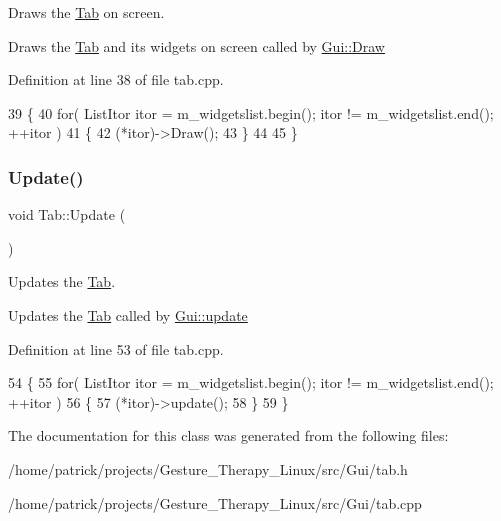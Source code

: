 Draws the \hyperlink{class_tab}{Tab} on screen. 

Draws the \hyperlink{class_tab}{Tab} and its widgets on screen called by \hyperlink{class_gui_acf4f1d3954d40aec3bc0ab4652b6a060}{Gui\+::\+Draw} 

Definition at line 38 of file tab.\+cpp.


\begin{DoxyCode}
39 \{
40     \textcolor{keywordflow}{for}( ListItor itor = m\_widgetslist.begin(); itor != m\_widgetslist.end(); ++itor )
41     \{
42         (*itor)->Draw();
43     \}   
44 
45 \}
\end{DoxyCode}
\mbox{\label{class_tab_a67a6f492fc37ea3632604802f10a4f18}} 
\subsubsection{\texorpdfstring{Update()}{Update()}}
{\footnotesize\ttfamily void Tab\+::\+Update (\begin{DoxyParamCaption}{ }\end{DoxyParamCaption})}



Updates the \hyperlink{class_tab}{Tab}. 

Updates the \hyperlink{class_tab}{Tab} called by \hyperlink{class_gui_af057adcdd96ee8b8021519d68ed9042e}{Gui\+::update} 

Definition at line 53 of file tab.\+cpp.


\begin{DoxyCode}
54 \{
55     \textcolor{keywordflow}{for}( ListItor itor = m\_widgetslist.begin(); itor != m\_widgetslist.end(); ++itor )
56     \{
57             (*itor)->update();
58     \}  
59 \}
\end{DoxyCode}


The documentation for this class was generated from the following files\+:\begin{DoxyCompactItemize}
\item 
/home/patrick/projects/\+Gesture\+\_\+\+Therapy\+\_\+\+Linux/src/\+Gui/tab.\+h\item 
/home/patrick/projects/\+Gesture\+\_\+\+Therapy\+\_\+\+Linux/src/\+Gui/tab.\+cpp\end{DoxyCompactItemize}
